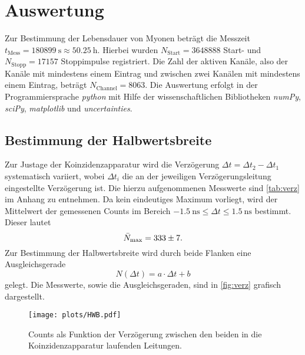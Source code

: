 \section{Auswertung}

Zur Bestimmung der Lebensdauer von Myonen beträgt die Messzeit $ t_\mathrm{Mess} = \SI{180899}{\second} \approx \SI{50.25}{\hour}$. Hierbei wurden $N_\mathrm{Start} = \num{3648888}$ Start- und $N_\mathrm{Stopp} = \num{17157}$ Stoppimpulse registriert. Die Zahl der aktiven Kanäle, also der Kanäle mit mindestens einem Eintrag und zwischen zwei Kanälen mit mindestens einem Eintrag, beträgt $N_{\mathrm{Channel}} = \num{8063}$.
Die Auswertung erfolgt in der Programmiersprache \textit{python} mit Hilfe der wissenschaftlichen Bibliotheken \textit{numPy}\cite{numpy}, \textit{sciPy}\cite{scipy}, \textit{matplotlib}\cite{matplotlib} und \textit{uncertainties}\cite{uncertainties}.

\subsection{Bestimmung der Halbwertsbreite}
Zur Justage der Koinzidenzapparatur wird die Verzögerung $\Delta t = \Delta t_2 - \Delta t_1$ systematisch variiert, wobei $\Delta t_i$ die an der jeweiligen Verzögerungsleitung eingestellte Verzögerung ist. Die hierzu aufgenommenen Messwerte sind \autoref{tab:verz} im Anhang zu entnehmen.
Da kein eindeutiges Maximum vorliegt, wird der Mittelwert der gemessenen Counts im Bereich $\SI{-1.5}{\ns} \leq \Delta t \leq \SI{1.5}{\ns}$ bestimmt. Dieser lautet
\begin{equation*}
  \bar{N}_\mathrm{max} = \num{333 \pm 7}.
\end{equation*}
Zur Bestimmung der Halbwertsbreite wird durch beide Flanken eine Ausgleichsgerade
\begin{equation*}
  N(\Delta t) = a \cdot \Delta t + b
\end{equation*}
gelegt. Die Messwerte, sowie die Ausgleichsgeraden, sind in \autoref{fig:verz} grafisch dargestellt.

\begin{figure}[H]
  \centering
  \texttt{[image: plots/HWB.pdf]}
  \caption{Counts als Funktion der Verzögerung zwischen den beiden in die Koinzidenzapparatur laufenden Leitungen.}
  \label{fig:verz}
\end{figure}

